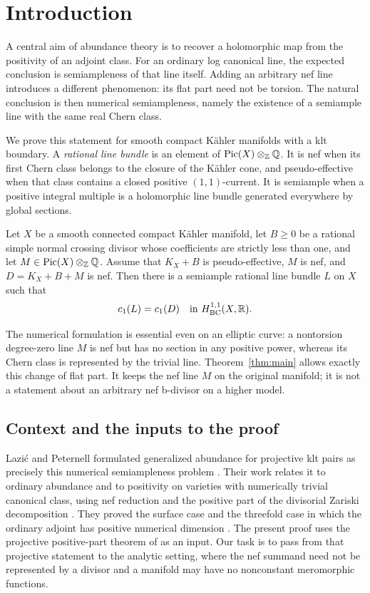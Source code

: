 \section{Introduction}\label{sec:introduction}

A central aim of abundance theory is to recover a holomorphic map from
the positivity of an adjoint class. For an ordinary log canonical line,
the expected conclusion is semiampleness of that line itself.
Adding an arbitrary nef line introduces a different phenomenon: its
flat part need not be torsion. The natural conclusion is then numerical
semiampleness, namely the existence of a semiample line with the same
real Chern class.

We prove this statement for smooth compact K\"ahler manifolds with a
klt boundary. A \emph{rational line bundle} is an element of
\(\operatorname{Pic}(X)\otimes_{\mathbb Z}\mathbb Q\). It is nef when its first Chern class belongs
to the closure of the K\"ahler cone, and pseudo-effective when that
class contains a closed positive \((1,1)\)-current. It is semiample
when a positive integral multiple is a holomorphic line bundle
generated everywhere by global sections.

\begin{theorem}\label{thm:main}
Let \(X\) be a smooth connected compact K\"ahler manifold, let
\(B\geq0\) be a rational simple normal crossing divisor whose
coefficients are strictly less than one, and let
\(M\in\operatorname{Pic}(X)\otimes_{\mathbb Z}\mathbb Q\).
Assume that \(K_X+B\) is pseudo-effective, \(M\) is nef, and
\(D=K_X+B+M\) is nef. Then there is a semiample rational line bundle
\(L\) on \(X\) such that
\[
 c_1(L)=c_1(D)\quad\text{in }H^{1,1}_{\mathrm{BC}}(X,\mathbb R).
\]
\end{theorem}

The numerical formulation is essential even on an elliptic curve:
a nontorsion degree-zero line \(M\) is nef but has no section in any
positive power, whereas its Chern class is represented by the trivial
line. Theorem~\ref{thm:main} allows exactly this change of flat part.
It keeps the nef line \(M\) on the original manifold; it is not a
statement about an arbitrary nef b-divisor on a higher model.

\subsection{Context and the inputs to the proof}

Lazi\'c and Peternell formulated generalized abundance for projective
klt pairs as precisely this numerical semiampleness problem
\cite[Generalised Abundance Conjecture]{LP1}. Their work relates it to ordinary abundance
and to positivity on varieties with numerically trivial canonical
class, using nef reduction and the positive part of the divisorial
Zariski decomposition \cite{LP1,LP2}. They proved the surface case and
the threefold case in which the ordinary adjoint has positive numerical
dimension \cite[Corollaries~C and~D]{LP1}.
The present proof uses the projective positive-part theorem of
\cite[Proposition~8.1]{P} as an input. Our task is to pass from that
projective statement to the analytic setting, where the nef summand
need not be represented by a divisor and a manifold may have no
nonconstant meromorphic functions.

